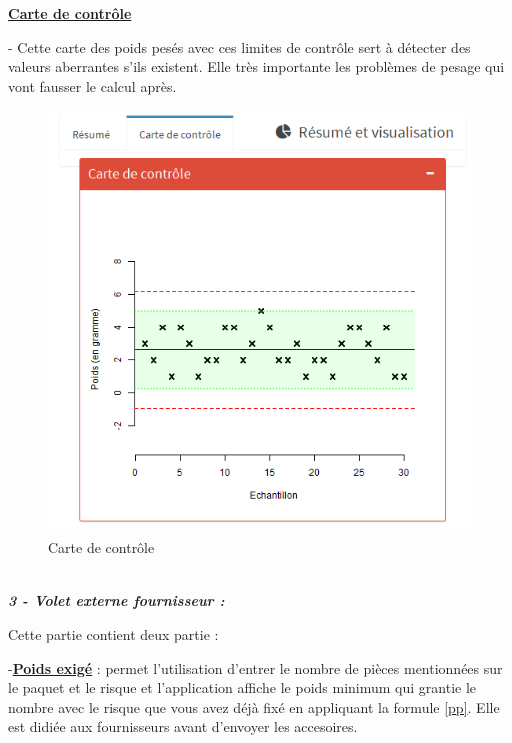\documentclass[12pt, a4paper]{thesis}
\begin{document}
\underline{\textbf{Carte de contrôle}}
\item - Cette carte des poids pesés avec ces limites de contrôle sert à détecter des valeurs aberrantes s'ils existent. Elle très importante les problèmes de pesage qui vont fausser le calcul après.\\

\begin{figure}[!h]
\begin{center} 
\includegraphics[scale=0.7]{appcar} 
\caption{Carte de contrôle}
\end{center}
\end{figure}\\



\textit{\textbf{3 - Volet externe fournisseur :}} 

 Cette partie contient deux partie :
\item -\underline{\textbf{Poids exigé}} : permet l'utilisation d'entrer le nombre de pièces mentionnées sur le paquet et le risque et l'application affiche le poids minimum qui grantie le nombre avec le risque que vous avez déjà fixé en appliquant la formule \eqref{pp}. Elle est didiée aux fournisseurs avant d'envoyer les accesoires.
\end{document}
